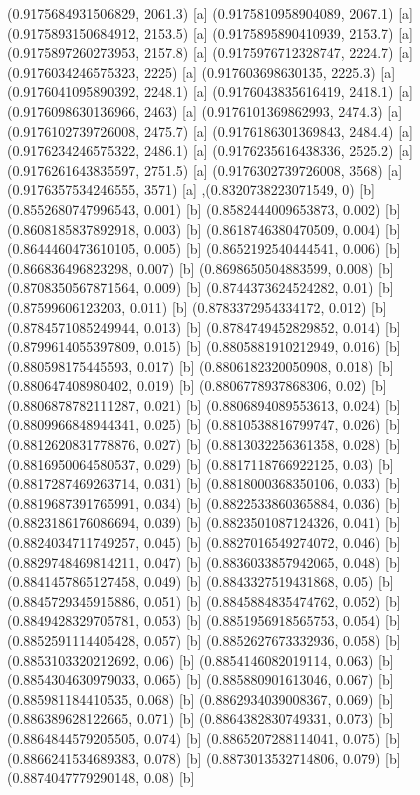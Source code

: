 {{{(0.9175684931506829, 2061.3) [a] 
(0.9175810958904089, 2067.1) [a] 
(0.9175893150684912, 2153.5) [a] 
(0.9175895890410939, 2153.7) [a] 
(0.9175897260273953, 2157.8) [a] 
(0.9175976712328747, 2224.7) [a] 
(0.9176034246575323, 2225) [a] 
(0.917603698630135, 2225.3) [a] 
(0.9176041095890392, 2248.1) [a] 
(0.9176043835616419, 2418.1) [a] 
(0.9176098630136966, 2463) [a] 
(0.9176101369862993, 2474.3) [a] 
(0.9176102739726008, 2475.7) [a] 
(0.9176186301369843, 2484.4) [a] 
(0.9176234246575322, 2486.1) [a] 
(0.9176235616438336, 2525.2) [a] 
(0.9176261643835597, 2751.5) [a] 
(0.9176302739726008, 3568) [a] 
(0.9176357534246555, 3571) [a] 
},{(0.8320738223071549, 0) [b] 
(0.8552680747996543, 0.001) [b] 
(0.8582444009653873, 0.002) [b] 
(0.8608185837892918, 0.003) [b] 
(0.8618746380470509, 0.004) [b] 
(0.8644460473610105, 0.005) [b] 
(0.8652192540444541, 0.006) [b] 
(0.866836496823298, 0.007) [b] 
(0.8698650504883599, 0.008) [b] 
(0.8708350567871564, 0.009) [b] 
(0.8744373624524282, 0.01) [b] 
(0.87599606123203, 0.011) [b] 
(0.8783372954334172, 0.012) [b] 
(0.8784571085249944, 0.013) [b] 
(0.8784749452829852, 0.014) [b] 
(0.8799614055397809, 0.015) [b] 
(0.8805881910212949, 0.016) [b] 
(0.880598175445593, 0.017) [b] 
(0.8806182320050908, 0.018) [b] 
(0.880647408980402, 0.019) [b] 
(0.8806778937868306, 0.02) [b] 
(0.8806878782111287, 0.021) [b] 
(0.8806894089553613, 0.024) [b] 
(0.8809966848944341, 0.025) [b] 
(0.8810538816799747, 0.026) [b] 
(0.8812620831778876, 0.027) [b] 
(0.8813032256361358, 0.028) [b] 
(0.8816950064580537, 0.029) [b] 
(0.8817118766922125, 0.03) [b] 
(0.8817287469263714, 0.031) [b] 
(0.8818000368350106, 0.033) [b] 
(0.8819687391765991, 0.034) [b] 
(0.8822533860365884, 0.036) [b] 
(0.8823186176086694, 0.039) [b] 
(0.8823501087124326, 0.041) [b] 
(0.8824034711749257, 0.045) [b] 
(0.8827016549274072, 0.046) [b] 
(0.8829748469814211, 0.047) [b] 
(0.8836033857942065, 0.048) [b] 
(0.8841457865127458, 0.049) [b] 
(0.8843327519431868, 0.05) [b] 
(0.8845729345915886, 0.051) [b] 
(0.8845884835474762, 0.052) [b] 
(0.8849428329705781, 0.053) [b] 
(0.8851956918565753, 0.054) [b] 
(0.8852591114405428, 0.057) [b] 
(0.8852627673332936, 0.058) [b] 
(0.8853103320212692, 0.06) [b] 
(0.8854146082019114, 0.063) [b] 
(0.8854304630979033, 0.065) [b] 
(0.885880901613046, 0.067) [b] 
(0.885981184410535, 0.068) [b] 
(0.8862934039008367, 0.069) [b] 
(0.886389628122665, 0.071) [b] 
(0.8864382830749331, 0.073) [b] 
(0.8864844579205505, 0.074) [b] 
(0.8865207288114041, 0.075) [b] 
(0.8866241534689383, 0.078) [b] 
(0.8873013532714806, 0.079) [b] 
(0.8874047779290148, 0.08) [b] 
}}}
